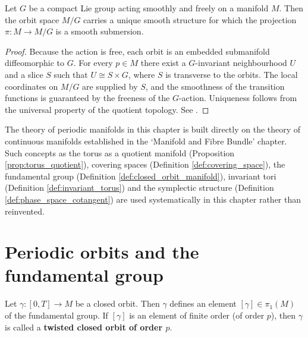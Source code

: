 \begin{proposition}\label{prop:quotient_smooth}
Let $G$ be a compact Lie group acting smoothly and freely on a manifold $M$. Then the orbit space $M/G$ carries a unique smooth structure for which the projection $\pi:M\to M/G$ is a smooth submersion.
\end{proposition}

\begin{proof}
Because the action is free, each orbit is an embedded submanifold diffeomorphic to $G$. For every $p\in M$ there exist a $G$-invariant neighbourhood $U$ and a slice $S$ such that $U\cong S\times G$, where $S$ is transverse to the orbits. The local coordinates on $M/G$ are supplied by $S$, and the smoothness of the transition functions is guaranteed by the freeness of the $G$-action. Uniqueness follows from the universal property of the quotient topology. See \cite{wang2023manifolds}.
\end{proof}

\begin{remark}\label{rem:periodic_manifold_relation}
The theory of periodic manifolds in this chapter is built directly on the theory of continuous manifolds established in the `Manifold and Fibre Bundle' chapter. Such concepts as the torus as a quotient manifold (Proposition \ref{prop:torus_quotient}), covering spaces (Definition \ref{def:covering_space}), the fundamental group (Definition \ref{def:closed_orbit_manifold}), invariant tori (Definition \ref{def:invariant_torus}) and the symplectic structure (Definition \ref{def:phase_space_cotangent}) are used systematically in this chapter rather than reinvented.
\end{remark}

\section{Periodic orbits and the fundamental group}\label{sec:periodic_orbit_fundamental_group}

\begin{definition}\label{def:closed_orbit_twisting}
Let $\gamma:[0,T]\to M$ be a closed orbit. Then $\gamma$ defines an element $[\gamma]\in\pi_1(M)$ of the fundamental group. If $[\gamma]$ is an element of finite order (of order $p$), then $\gamma$ is called a \textbf{twisted closed orbit of order $p$}.
\end{definition}

